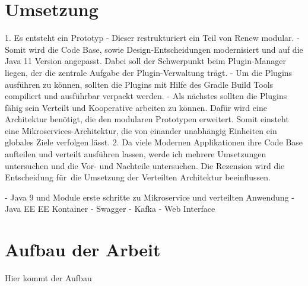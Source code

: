 \section{Umsetzung}
1. Es entsteht ein Prototyp 
	- Dieser restrukturiert ein Teil von Renew modular.
	- Somit wird die Code Base, sowie Design-Entscheidungen modernisiert und auf die Java 11 Version angepasst. Dabei soll der Schwerpunkt beim Plugin-Manager liegen, der die zentrale Aufgabe der Plugin-Verwaltung trägt.    
	- Um die Plugins ausführen zu können, sollten die Plugins mit Hilfe des Gradle Build Tools compiliert und ausführbar verpackt werden. 
	-  Als nächstes sollten die Plugins fähig sein Verteilt und Kooperative arbeiten zu können. Dafür wird eine Architektur benötigt, die den modularen Prototypen erweitert. Somit einsteht eine Mikroservices-Architektur, die von einander unabhängig Einheiten ein globales Ziele verfolgen lässt. 
2. Da viele Modernen Applikationen ihre Code Base aufteilen und verteilt ausführen lassen, werde ich mehrere Umsetzungen untersuchen und die Vor- und Nachteile untersuchen. Die Rezension wird die Entscheidung für die Umsetzung der Verteilten Architektur beeinflussen.

- Java 9 und Module erste schritte zu Mikroservice und verteilten Anwendung  
- Java EE  EE Kontainer
- Swagger 
- Kafka
- Web Interface 
\section{Aufbau der Arbeit}
Hier kommt der Aufbau 

